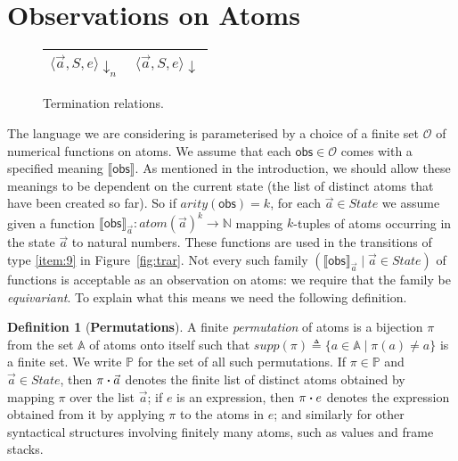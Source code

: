 \documentclass{LMCS}
\theoremstyle{plain}
\theoremstyle{definition}
\newtheorem{definition}[thm]{Definition}
\newcommand{\act}{\mathbin{\mbox{\boldmath$\cdot$}}}
\newcommand{\arity}{\mathit{arity}}
\newcommand{\atm}[1][a]{#1}
\newcommand{\Atom}{\mathbb{A}}
\newcommand{\atoms}{\mathit{atom}}
\newcommand{\config}[3]{\langle#1, #2, #3\rangle}
\newcommand{\defeq}{\triangleq}
\newcommand{\den}[1]{\llbracket#1\rrbracket}\newcommand{\DIVERGE}{\kw{diverge}}
\newcommand{\es}{\mathit{Id}}
\renewcommand{\exp}[1][e]{#1}
\newcommand{\fun}{\rightarrow}
\newcommand{\kw}[1]{\mathsf{#1}}
\newcommand{\NNO}{\mathbb{N}}
\newcommand{\Obs}{\mathcal{O}}
\newcommand{\OBS}[1][obs]{\kw{#1}}
\newcommand{\Perm}{\mathbb{P}}
\newcommand{\State}{\mathit{State}}
\newcommand{\s}[1][a]{\vec{#1}}
\newcommand{\stk}[1][S]{#1}
\newcommand{\supp}{\mathit{supp}}
\newcommand{\terminates}[1][]{{\downarrow_{#1}}}
\newcommand{\trans}{\longrightarrow}
\newcommand{\val}[1][v]{#1}
\begin{document}
\section{Observations on Atoms}
\label{sec:observations-atoms}


\begin{figure}\small
  \renewcommand{\arraystretch}{1.5}
  \begin{center}
    \begin{tabular}{|c|c|}
      \hline
      $\config{\s}{\stk}{\exp}\terminates[n]$ &
      \strut$\config{\s}{\stk}{\exp}\terminates$\\\hline
    \end{tabular}  
  \end{center}
  \caption{Termination relations.}
  \label{fig:terr}
\end{figure}

The language we are considering is parameterised by a choice of a
finite set $\Obs$ of numerical functions on atoms.  We assume that
each $\OBS\in\Obs$ comes with a specified meaning $\den{\OBS}$. As
mentioned in the introduction, we should allow these meanings to be
dependent on the current state (the list of distinct atoms that have
been created so far). So if $\arity(\OBS)=k$, for each $\s\in\State$
we assume given a function $\den{\OBS}_{\s}:\atoms(\s)^k\fun\NNO$
mapping $k$-tuples of atoms occurring in the state $\s$ to natural
numbers.  These functions are used in the transitions of type
\ref{item:9} in Figure~\ref{fig:trar}. Not every such family
$(\den{\OBS}_{\s}\mid\s\in\State)$ of functions is acceptable as an
observation on atoms: we require that the family be
\emph{equivariant}. To explain what this means we need the following
definition.

\begin{definition}[\textbf{Permutations}]
  \label{def:perms}
  A finite \emph{permutation} of atoms is a bijection $\pi$ from the
  set $\Atom$ of atoms onto itself such that
  $\supp(\pi)\defeq\{\atm\in\Atom\mid \pi(\atm)\not=\atm\}$ is a
  finite set. We write $\Perm$ for the set of all such permutations.
  If $\pi\in\Perm$ and $\s\in\State$, then $\pi\act\s$ denotes the
  finite list of distinct atoms obtained by mapping $\pi$ over the
  list $\s$; if $\exp$ is an expression, then $\pi\act\exp$ denotes
  the expression obtained from it by applying $\pi$ to the atoms in
  $\exp$; and similarly for other syntactical structures involving
  finitely many atoms, such as values and frame stacks.
\end{definition}
\end{document}
